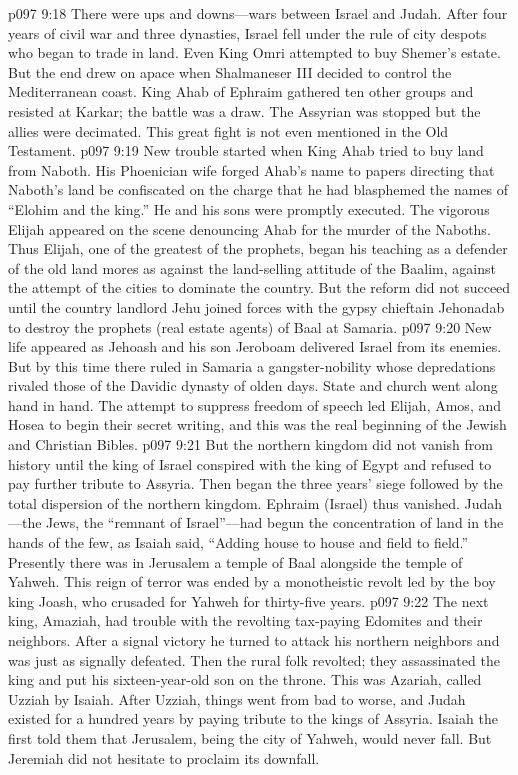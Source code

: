 \vs p097 9:18 There were ups and downs---wars between Israel and Judah. After four years of civil war and three dynasties, Israel fell under the rule of city despots who began to trade in land. Even King Omri attempted to buy Shemer’s estate. But the end drew on apace when Shalmaneser III decided to control the Mediterranean coast. King Ahab of Ephraim gathered ten other groups and resisted at Karkar; the battle was a draw. The Assyrian was stopped but the allies were decimated. This great fight is not even mentioned in the Old Testament.
\vs p097 9:19 New trouble started when King Ahab tried to buy land from Naboth. His Phoenician wife forged Ahab’s name to papers directing that Naboth’s land be confiscated on the charge that he had blasphemed the names of “Elohim and the king.” He and his sons were promptly executed. The vigorous Elijah appeared on the scene denouncing Ahab for the murder of the Naboths. Thus Elijah, one of the greatest of the prophets, began his teaching as a defender of the old land mores as against the land\hyp{}selling attitude of the Baalim, against the attempt of the cities to dominate the country. But the reform did not succeed until the country landlord Jehu joined forces with the gypsy chieftain Jehonadab to destroy the prophets (real estate agents) of Baal at Samaria.
\pc \vs p097 9:20 New life appeared as Jehoash and his son Jeroboam delivered Israel from its enemies. But by this time there ruled in Samaria a gangster\hyp{}nobility whose depredations rivaled those of the Davidic dynasty of olden days. State and church went along hand in hand. The attempt to suppress freedom of speech led Elijah, Amos, and Hosea to begin their secret writing, and this was the real beginning of the Jewish and Christian Bibles.
\pc \vs p097 9:21 But the northern kingdom did not vanish from history until the king of Israel conspired with the king of Egypt and refused to pay further tribute to Assyria. Then began the three years’ siege followed by the total dispersion of the northern kingdom. Ephraim (Israel) thus vanished. Judah---the Jews, the “remnant of Israel”---had begun the concentration of land in the hands of the few, as Isaiah said, “Adding house to house and field to field.” Presently there was in Jerusalem a temple of Baal alongside the temple of Yahweh. This reign of terror was ended by a monotheistic revolt led by the boy king Joash, who crusaded for Yahweh for thirty\hyp{}five years.
\vs p097 9:22 The next king, Amaziah, had trouble with the revolting tax\hyp{}paying Edomites and their neighbors. After a signal victory he turned to attack his northern neighbors and was just as signally defeated. Then the rural folk revolted; they assassinated the king and put his sixteen\hyp{}year\hyp{}old son on the throne. This was Azariah, called Uzziah by Isaiah. After Uzziah, things went from bad to worse, and Judah existed for a hundred years by paying tribute to the kings of Assyria. Isaiah the first told them that Jerusalem, being the city of Yahweh, would never fall. But Jeremiah did not hesitate to proclaim its downfall.
